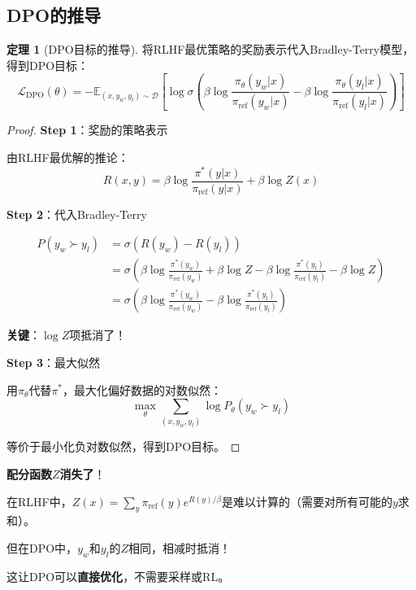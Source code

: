 \documentclass[11pt,a4paper]{article}
\theoremstyle{definition}
\newtheorem{theorem}{定理}[section]
\begin{document}
\subsection{DPO的推导}

\begin{theorem}[DPO目标的推导]
将RLHF最优策略的奖励表示代入Bradley-Terry模型，得到DPO目标：
\[
\mathcal{L}_{\text{DPO}}(\theta) = -\mathbb{E}_{(x, y_w, y_l) \sim \mathcal{D}}\left[\log \sigma\left(\beta \log \frac{\pi_\theta(y_w|x)}{\pi_{\text{ref}}(y_w|x)} - \beta \log \frac{\pi_\theta(y_l|x)}{\pi_{\text{ref}}(y_l|x)}\right)\right]
\]
\end{theorem}

\begin{proof}
\textbf{Step 1}：奖励的策略表示

由RLHF最优解的推论：
\[
R(x, y) = \beta \log \frac{\pi^*(y|x)}{\pi_{\text{ref}}(y|x)} + \beta \log Z(x)
\]

\textbf{Step 2}：代入Bradley-Terry

\begin{align*}
P(y_w \succ y_l) &= \sigma(R(y_w) - R(y_l)) \\
&= \sigma\left(\beta \log \frac{\pi^*(y_w)}{\pi_{\text{ref}}(y_w)} + \beta \log Z - \beta \log \frac{\pi^*(y_l)}{\pi_{\text{ref}}(y_l)} - \beta \log Z\right) \\
&= \sigma\left(\beta \log \frac{\pi^*(y_w)}{\pi_{\text{ref}}(y_w)} - \beta \log \frac{\pi^*(y_l)}{\pi_{\text{ref}}(y_l)}\right)
\end{align*}

\textbf{关键}：$\log Z$项抵消了！

\textbf{Step 3}：最大似然

用$\pi_\theta$代替$\pi^*$，最大化偏好数据的对数似然：
\[
\max_\theta \sum_{(x, y_w, y_l)} \log P_\theta(y_w \succ y_l)
\]

等价于最小化负对数似然，得到DPO目标。
\end{proof}

\begin{keypoint}[DPO的神奇之处]
\textbf{配分函数$Z$消失了}！

在RLHF中，$Z(x) = \sum_y \pi_{\text{ref}}(y) e^{R(y)/\beta}$是难以计算的（需要对所有可能的$y$求和）。

但在DPO中，$y_w$和$y_l$的$Z$相同，相减时抵消！

这让DPO可以\textbf{直接优化}，不需要采样或RL。
\end{keypoint}
\end{document}
